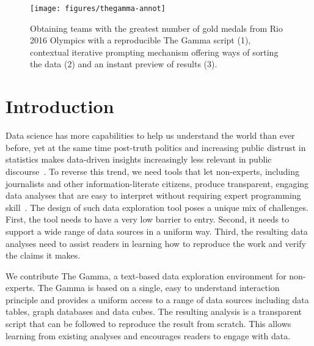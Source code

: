 \documentclass[manuscript,review,anonymous]{acmart}
\begin{document}
\maketitle

\begin{figure}
\texttt{[image: figures/thegamma-annot]}
\vspace{-0.5em}
\caption{Obtaining teams with the greatest number of gold medals from Rio 2016
Olympics with a reproducible The Gamma script (1), contextual iterative prompting mechanism
offering ways of sorting the data (2) and an instant preview of results (3).}
\label{fig:thegamma}
\vspace{-0.5em}
\end{figure}


\section{Introduction}
Data science has more capabilities to help us understand the world than ever before, yet at the
same time post-truth politics and increasing public distrust in statistics makes data-driven insights
increasingly less relevant in public discourse~\cite{howstatslost}. To reverse this trend, we
need tools that let non-experts, including journalists and other information-literate citizens,
produce transparent, engaging data analyses that are easy to interpret without requiring expert
programming skill~\cite{ddj}. The design of such data exploration tool poses a unique mix of challenges.
First, the tool needs to have a very low barrier to entry. Second, it needs to support a wide
range of data sources in a uniform way. Third, the resulting data analyses need to assist
readers in learning how to reproduce the work and verify the claims it makes.

We contribute The Gamma, a text-based data exploration environment for non-experts. The Gamma
is based on a single, easy to understand interaction principle and provides a uniform
access to a range of data sources including data tables, graph databases and data cubes.
The resulting analysis is a transparent script that can be followed to reproduce the
result from scratch. This allows learning from existing analyses and encourages readers
to engage with data.
\end{document}
